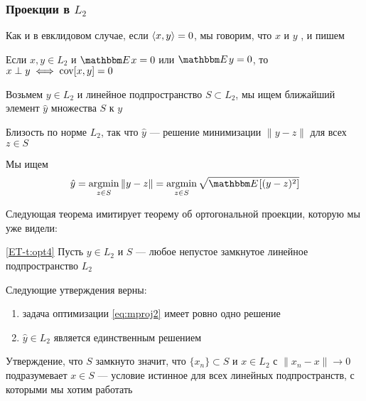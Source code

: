 \begin{frame}\frametitle{Проекции в $L_2$}

    \vspace{2em}
    Как и в евклидовом случае, если $\left\langle{x,y}\right\rangle=0$, мы говорим, что $x$ и $y$
    , и пишем 
    
    \vspace{1em}
    \Fact
    Если $x, y \in L_2$ и $\EE x=0$ или $\EE y=0$, то $x \perp y
    \iff  \operatorname{cov}[x,y] = 0$
    
\end{frame}

\begin{frame}
    
    \vspace{2em}
    Возьмем $y \in L_2$ и
    линейное подпространство $S \subset L_2$, мы ищем ближайший элемент $\hat y$ множества $S$
    к $y$
    
    Близость по норме $L_2$, так что $\hat y$ --- решение минимизации
    $\| y - z \|$ для всех $z \in S$
    
    Мы ищем
    \begin{equation}
        \label{eq:mproj2}
        \hat y 
        = \argmin_{z \in S} \|y - z\|
        = \argmin_{z \in S} \sqrt{\EE [ (y - z)^2 ]}
    \end{equation}

\end{frame}

\begin{frame}

    \vspace{2em}
    Следующая теорема имитирует теорему об ортогональной проекции, которую мы уже видели:
    
    \vspace{.7em}
    \Thm\eqref{ET-t:opt4}
    Пусть $y \in L_2$ и $S$ --- любое непустое замкнутое
    линейное подпространство $L_2$
    
    Следующие утверждения верны:
    \begin{enumerate}
        \item задача оптимизации \eqref{eq:mproj2} имеет ровно одно решение
        \item $\hat y \in L_2$ является единственным решением
    \end{enumerate}
    Утверждение, что $S$ замкнуто значит, что $\{x_n \} \subset S$ и $x
    \in L_2$ с $\| x_n - x \| \to 0$ подразумевает $x \in S$ ---  условие истинное
    для всех линейных подпространств, с которыми мы хотим работать
    
\end{frame}

